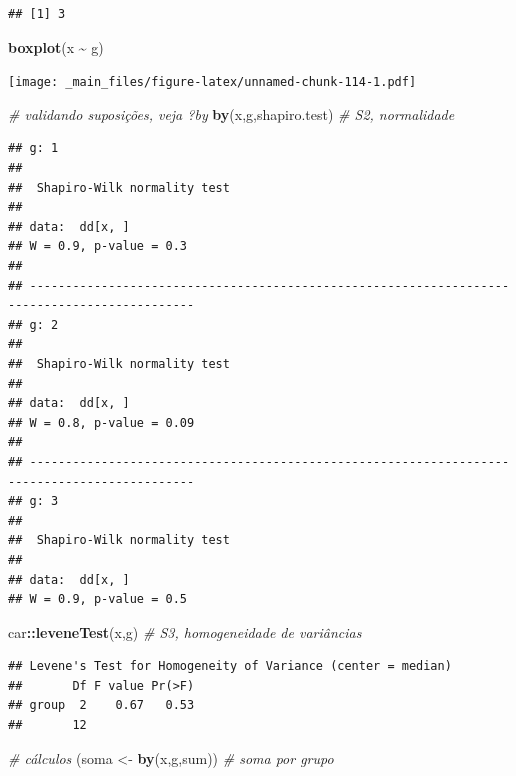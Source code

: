 \documentclass[
]{book}
\newenvironment{Shaded}{\begin{snugshade}}{\end{snugshade}}
\newcommand{\CommentTok}[1]{\textcolor[rgb]{0.56,0.35,0.01}{\textit{#1}}}
\newcommand{\KeywordTok}[1]{\textcolor[rgb]{0.13,0.29,0.53}{\textbf{#1}}}
\newcommand{\NormalTok}[1]{#1}
\newcommand{\OperatorTok}[1]{\textcolor[rgb]{0.81,0.36,0.00}{\textbf{#1}}}
\newcommand{\StringTok}[1]{\textcolor[rgb]{0.31,0.60,0.02}{#1}}
\theoremstyle{definition}
\theoremstyle{definition}
\theoremstyle{definition}
\theoremstyle{remark}
\begin{document}
\begin{verbatim}
## [1] 3
\end{verbatim}

\begin{Shaded}
\begin{Highlighting}[]
\KeywordTok{boxplot}\NormalTok{(x }\OperatorTok{\textasciitilde{}}\StringTok{ }\NormalTok{g)}
\end{Highlighting}
\end{Shaded}

\texttt{[image: \_main\_files/figure-latex/unnamed-chunk-114-1.pdf]}

\begin{Shaded}
\begin{Highlighting}[]
\CommentTok{\# validando suposições, veja ?by}
\KeywordTok{by}\NormalTok{(x,g,shapiro.test)  }\CommentTok{\# S2, normalidade}
\end{Highlighting}
\end{Shaded}

\begin{verbatim}
## g: 1
## 
##  Shapiro-Wilk normality test
## 
## data:  dd[x, ]
## W = 0.9, p-value = 0.3
## 
## --------------------------------------------------------------------------------------------- 
## g: 2
## 
##  Shapiro-Wilk normality test
## 
## data:  dd[x, ]
## W = 0.8, p-value = 0.09
## 
## --------------------------------------------------------------------------------------------- 
## g: 3
## 
##  Shapiro-Wilk normality test
## 
## data:  dd[x, ]
## W = 0.9, p-value = 0.5
\end{verbatim}

\begin{Shaded}
\begin{Highlighting}[]
\NormalTok{car}\OperatorTok{::}\KeywordTok{leveneTest}\NormalTok{(x,g)  }\CommentTok{\# S3, homogeneidade de variâncias}
\end{Highlighting}
\end{Shaded}

\begin{verbatim}
## Levene's Test for Homogeneity of Variance (center = median)
##       Df F value Pr(>F)
## group  2    0.67   0.53
##       12
\end{verbatim}

\begin{Shaded}
\begin{Highlighting}[]
\CommentTok{\# cálculos}
\NormalTok{(soma \textless{}{-}}\StringTok{ }\KeywordTok{by}\NormalTok{(x,g,sum))     }\CommentTok{\# soma por grupo}
\end{Highlighting}
\end{Shaded}
\end{document}
